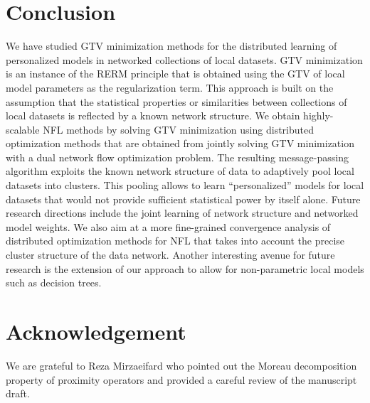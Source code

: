 \documentclass[lettersize,journal]{IEEEtran}
\begin{document}
\section{Conclusion} 
\label{sec_conclusion}
We have studied GTV minimization methods for the distributed learning of personalized models in 
networked collections of local datasets. GTV minimization is an instance of the RERM principle that 
is obtained using the GTV of local model parameters as the regularization term. This approach is built 
on the assumption that the statistical properties or similarities between collections of local datasets 
is reflected by a known network structure. We obtain highly-scalable NFL methods by solving GTV 
minimization using distributed optimization methods that are obtained from jointly solving GTV minimization with a 
dual network flow optimization problem. The resulting message-passing algorithm exploits the known 
network structure of data to adaptively pool local datasets into clusters. This pooling allows to learn 
``personalized'' models for local datasets that would not provide sufficient statistical power by itself alone. 
Future research directions include the joint learning of network structure and networked model weights. 
We also aim at a more fine-grained convergence analysis of distributed optimization methods for NFL 
that takes into account the precise cluster structure of the data network. Another interesting avenue for 
future research is the extension of our approach to allow for non-parametric local models such as 
decision trees. 


\section{Acknowledgement} 
We are grateful to Reza Mirzaeifard who pointed out the Moreau decomposition property 
of proximity operators and provided a careful review of the manuscript draft. 
\end{document}
